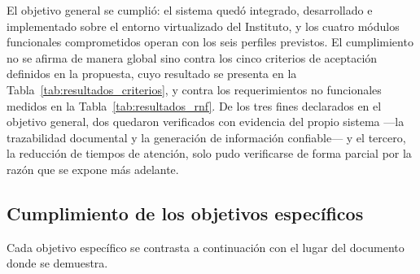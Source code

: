 El objetivo general se cumplió: el sistema quedó integrado, desarrollado e implementado sobre el entorno virtualizado del Instituto, y los cuatro módulos funcionales comprometidos operan con los seis perfiles previstos. El cumplimiento no se afirma de manera global sino contra los cinco criterios de aceptación definidos en la propuesta, cuyo resultado se presenta en la Tabla~\ref{tab:resultados_criterios}, y contra los requerimientos no funcionales medidos en la Tabla~\ref{tab:resultados_rnf}. De los tres fines declarados en el objetivo general, dos quedaron verificados con evidencia del propio sistema —la trazabilidad documental y la generación de información confiable— y el tercero, la reducción de tiempos de atención, solo pudo verificarse de forma parcial por la razón que se expone más adelante.

\subsection{Cumplimiento de los objetivos específicos}

Cada objetivo específico se contrasta a continuación con el lugar del documento donde se demuestra.

